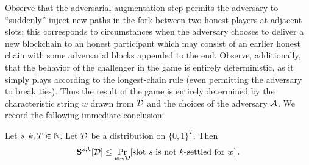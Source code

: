 Observe that the adversarial augmentation step permits the adversary to
``suddenly'' inject new paths in the fork between two honest
players at adjacent slots; this corresponds to circumstances
when the adversary chooses to deliver a new blockchain to an honest
participant which may consist of an earlier honest chain with some
adversarial blocks appended to the end. Observe, additionally, that
the behavior of the challenger in the game is entirely deterministic,
as it simply plays according to the longest-chain rule (even
permitting the adversary to break ties). Thus the result of the game
is entirely determined by the characteristic string $w$ drawn from
$\mathcal{D}$ and the choices of the adversary $\mathcal{A}$. 
We record the
following immediate conclusion:
\begin{lemma}\label{lem:main-forks}
  Let 
  $s, k, T \in \mathbb{N}$. 
  Let $\mathcal{D}$ be a distribution on $\{0,1\}^T$. Then
  \[
    \mathbf{S}^{s,k}[\mathcal{D}] \leq 
      \Pr_{w \sim \mathcal{D}}[\text{slot $s$ is not $k$-settled for $w$}]
    \,.
  \]
\end{lemma}

